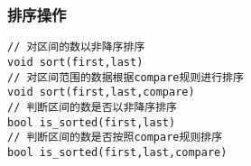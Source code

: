 \subsubsection{排序操作}
\begin{lstlisting}
// 对区间的数以非降序排序
void sort(first,last)
// 对区间范围的数据根据compare规则进行排序
void sort(first,last,compare)
// 判断区间的数是否以非降序排序
bool is_sorted(first,last)
// 判断区间的数是否按照compare规则排序
bool is_sorted(first,last,compare)
\end{lstlisting}